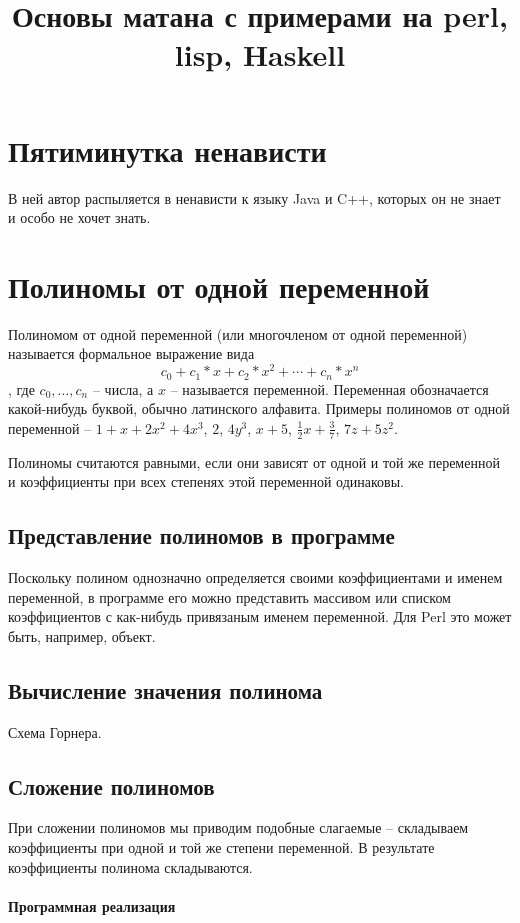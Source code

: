 \documentclass{article}
\begin{document}
\title{Основы матана с примерами на perl, lisp, Haskell}
\maketitle
\section{Пятиминутка ненависти}
В ней автор распыляется в ненависти к языку Java и C++, которых он не знает и особо не хочет знать.
\section{Полиномы от одной переменной}
Полиномом от одной переменной (или многочленом от одной переменной) называется формальное выражение вида
$$c_0+c_1*x+c_2*x^2+\cdots+c_n*x^n$$, где $c_0,\dots, c_n$ -- числа, а $x$ -- называется переменной. 
Переменная обозначается какой-нибудь буквой, обычно латинского алфавита.
Примеры полиномов от одной переменной -- $1+x+2 x^2+4 x^3$, $2$, $4y^3$, $x+5$, $\frac{1}{2}x+\frac{3}{7}$,
$7 z +5 z^2$. 

Полиномы считаются равными, если они зависят от одной и той же переменной и коэффициенты при всех степенях этой переменной одинаковы.
\subsection{Представление полиномов в программе}
Поскольку полином однозначно определяется своими коэффициентами и именем переменной, в программе его можно представить массивом или списком коэффициентов с как-нибудь привязаным именем переменной. Для Perl это может быть, например, объект.
\subsection{Вычисление значения полинома}
Схема Горнера.
\subsection{Сложение полиномов}
При сложении полиномов мы приводим подобные слагаемые -- складываем коэффициенты при одной и той же степени переменной. В результате коэффициенты полинома складываются. 
\paragraph{Программная реализация}
\end{document}

